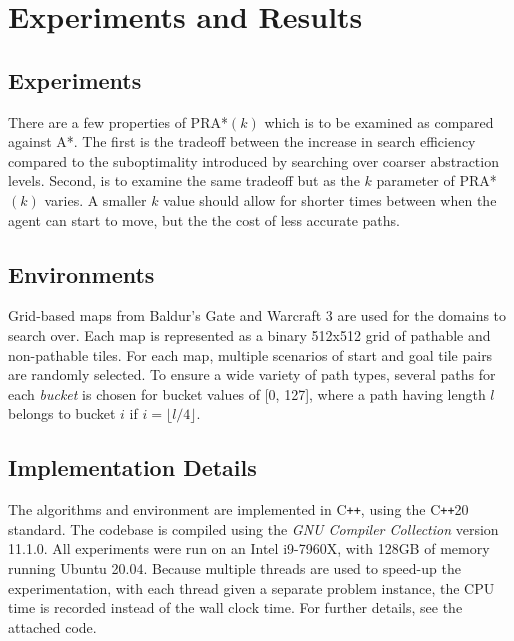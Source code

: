 \documentclass[letterpaper]{article} %
\newcommand{\CC}{C\texttt{++}}
\begin{document}
\section{Experiments and Results}

\subsection*{Experiments}
There are a few properties of PRA*$(k)$ which is to be examined as compared against A*.
The first is the tradeoff between the increase in search efficiency compared to the suboptimality introduced by searching over coarser abstraction levels.
Second, is to examine the same tradeoff but as the $k$ parameter of PRA*$(k)$ varies.
A smaller $k$ value should allow for shorter times between when the agent can start to move, but the the cost of less accurate paths.

\subsection*{Environments}
Grid-based maps from Baldur's Gate and Warcraft 3 \cite{sturtevant2012benchmarks} are used for the domains to search over.
Each map is represented as a binary 512x512 grid of pathable and non-pathable tiles.
For each map, multiple scenarios of start and goal tile pairs are randomly selected.
To ensure a wide variety of path types, 
several paths for each \textit{bucket} is chosen for bucket values of [0, 127],
where a path having length $l$ belongs to bucket $i$ if $i = \lfloor l / 4 \rfloor$.


\subsection*{Implementation Details}
The algorithms and environment are implemented in {\CC},
using the {\CC}20 standard.
The codebase is compiled using the \textit{GNU Compiler Collection} version 11.1.0.
All experiments were run on an Intel i9-7960X, with 128GB of memory running Ubuntu 20.04.
Because multiple threads are used to speed-up the experimentation,
with each thread given a separate problem instance,
the CPU time is recorded instead of the wall clock time.
For further details, see the attached code.
\end{document}

